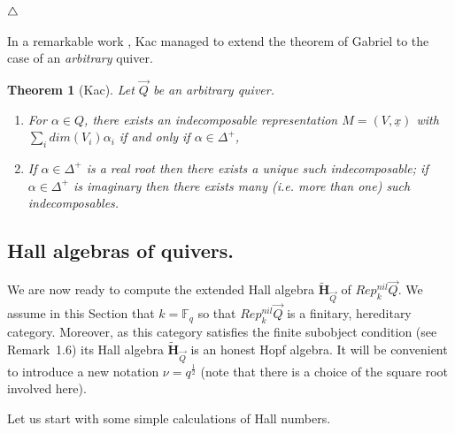 \documentclass[a4paper,10pt]{amsart}
\def\endexample{$\hfill \triangle$}
\def\a{\alpha}
\newtheorem{theo}{\bf{Theorem}}[section]
\numberwithin{equation}{section}
\begin{document}
\endexample

\vspace{.3in}

In a remarkable work \cite{Kac}, Kac managed to extend the theorem of Gabriel to the case of an \textit{arbitrary} quiver.

\vspace{.1in}

\begin{theo}[Kac]\label{T:Kac} Let $\vec{Q}$ be an arbitrary quiver.
\begin{enumerate}
\item[i)] For $\a \in Q$, there exists an indecomposable representation $M=(V,\underline{x})$ with
$\sum_i {dim}(V_i)\a_i$ if and only if $\a \in \Delta^+$,
\item[ii)] If $\a \in \Delta^+$ is a real root then there exists a unique such indecomposable; if $\a \in \Delta^+$ is imaginary then there exists many (i.e. more than one) such indecomposables.
\end{enumerate}
\end{theo}

\vspace{.2in}

\subsection{Hall algebras of quivers.}

\vspace{.15in}

We are now ready to compute the extended Hall algebra $\widetilde{\mathbf{H}}_{\vec{Q}}$ of $Rep^{nil}_k\vec{Q}$. We assume in this Section that $k=\mathbb{F}_q$ so that $Rep^{nil}_k\vec{Q}$ is a finitary, hereditary category. Moreover, as this category satisfies the finite subobject condition (see Remark~1.6) its Hall algebra $\widetilde{\mathbf{H}}_{\vec{Q}}$ is an honest Hopf algebra. It will be convenient to introduce a new notation $\nu=q^{\frac{1}{2}}$ (note that there is a choice of
the square root involved here).

\vspace{.15in}

Let us start with some simple calculations of Hall numbers.

\vspace{.1in}

\addtocounter{theo}{1}
\end{document}

